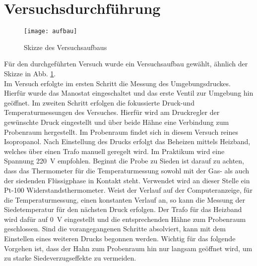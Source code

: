 \newpage
\section{Versuchsdurchführung}
\label{sec:durchfuerung}

\begin{figure}[h!]
	\centering
	\texttt{[image: aufbau]}
	\caption{Skizze des Versuchsaufbaus}
	\label{fig:aufbau}
\end{figure}
\FloatBarrier

Für den durchgeführten Versuch wurde ein Versuchsaufbau gewählt, ähnlich der Skizze in Abb. \ref{fig:aufbau}. \\
Im Versuch erfolgte im ersten Schritt die Messung des Umgebungsdruckes. Hierfür wurde das Manostat eingeschaltet und das erste Ventil zur Umgebung hin geöffnet. \linebreak
Im zweiten Schritt erfolgen die fokussierte Druck-und Temperaturmessungen des Versuches. Hierfür wird am Druckregler der gewünschte Druck eingestellt und über beide Hähne eine Verbindung zum Probenraum hergestellt. Im Probenraum findet sich in diesem Versuch reines Isopropanol. Nach Einstellung des Drucks erfolgt das Beheizen mittels Heizband, welches über einen Trafo manuell geregelt wird. Im Praktikum wird eine Spannung \SI{220}{\volt} empfohlen. 
Beginnt die Probe zu Sieden ist darauf zu achten, dass das Thermometer für die Temperaturmessung sowohl mit der Gas- als auch der siedenden Flüssigphase in Kontakt steht. Verwendet wird an dieser Stelle ein Pt-100 Widerstandsthermometer. Weist der Verlauf auf der Computeranzeige, für die Temperaturmessung, einen konstanten Verlauf an, so kann die Messung der Siedetemperatur für den nächsten Druck erfolgen.
Der Trafo für das Heizband wird dafür auf \SI{0}{\volt} eingestellt und die entsprechenden Hähne zum Probenraum geschlossen. \linebreak
Sind die vorangegangenen Schritte absolviert, kann mit dem Einstellen eines weiteren Drucks begonnen werden. Wichtig für das folgende Vorgehen ist, dass der Hahn zum Probenraum hin nur langsam geöffnet wird, um zu starke Siedeverzugseffekte zu vermeiden.
